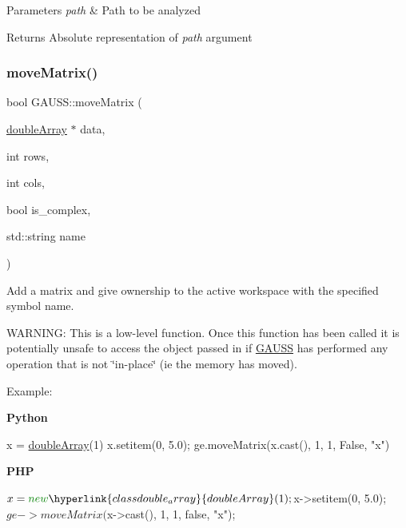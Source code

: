 \begin{DoxyParams}{Parameters}
{\em path} & Path to be analyzed \\
\hline
\end{DoxyParams}
\begin{DoxyReturn}{Returns}
Absolute representation of {\itshape path} argument 
\end{DoxyReturn}
\mbox{\label{class_g_a_u_s_s_ad178c9413021c4f0a9d49f742b227870}} 
\subsubsection{\texorpdfstring{move\+Matrix()}{moveMatrix()}\hspace{0.1cm}{\footnotesize\ttfamily [1/2]}}
{\footnotesize\ttfamily bool G\+A\+U\+S\+S\+::move\+Matrix (\begin{DoxyParamCaption}\item[{\hyperlink{classdouble_array}{double\+Array} $\ast$}]{data,  }\item[{int}]{rows,  }\item[{int}]{cols,  }\item[{bool}]{is\+\_\+complex,  }\item[{std\+::string}]{name }\end{DoxyParamCaption})}



Add a matrix and give ownership to the active workspace with the specified symbol name. 

W\+A\+R\+N\+I\+NG\+: This is a low-\/level function. Once this function has been called it is potentially unsafe to access the object passed in if \hyperlink{class_g_a_u_s_s}{G\+A\+U\+SS} has performed any operation that is not \char`\"{}in-\/place\char`\"{} (ie the memory has moved).

Example\+:

{\bfseries Python} 
\begin{DoxyCode}
x = \hyperlink{classdouble_array}{doubleArray}(1)
x.setitem(0, 5.0);
ge.moveMatrix(x.cast(), 1, 1, \textcolor{keyword}{False}, \textcolor{stringliteral}{"x"})
\end{DoxyCode}


 {\bfseries P\+HP} 
\begin{DoxyCode}
$x = \textcolor{keyword}{new} \hyperlink{classdouble_array}{doubleArray}(1);
$x->setitem(0, 5.0);
$ge->moveMatrix($x->cast(), 1, 1, \textcolor{keyword}{false}, \textcolor{stringliteral}{"x"});
\end{DoxyCode}



